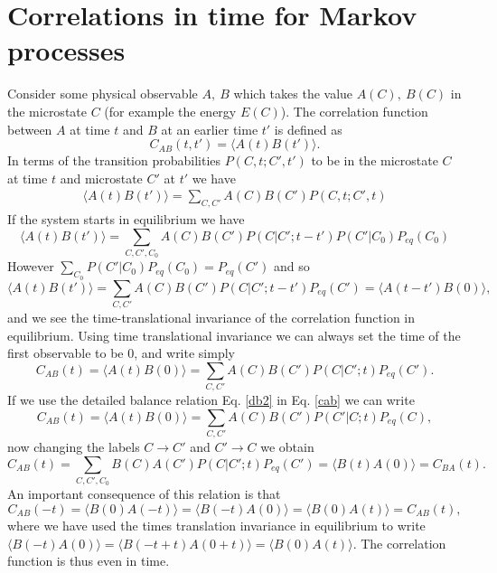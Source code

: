\documentclass[11pt]{report}
\begin{document}
\section{Correlations in time for Markov processes}
Consider some physical observable $A,\ B$ which takes the value $A(C),\ B(C)$ in the microstate 
$C$ (for example the energy $E(C)$). The correlation function between $A$ at time $t$ and
$B$ at an earlier time $t'$ is defined as
\begin{equation}
C_{AB}(t,t') = \langle A(t)B(t')\rangle .
\end{equation} 
In terms of the transition probabilities $P(C,t;C',t')$ to be in the microstate $C$ at time $t$ and microstate $C'$ at $t'$ we have
\begin{eqnarray}
\langle A(t)B(t')\rangle  = \sum_{C,C'} A(C)B(C') P(C,t;C',t)
\end{eqnarray} 
If the system starts in equilibrium we have
\begin{equation}
\langle A(t)B(t')\rangle  = \sum_{C,C',C_0} A(C)B(C') P(C|C';t-t')P(C'|C_0)P_{eq}(C_0)
\end{equation}
However $\sum_{C_0} P(C'|C_0)P_{eq}(C_0) = P_{eq}(C')$ and so
\begin{equation}
\langle A(t)B(t')\rangle= \sum_{C,C'} A(C)B(C') P(C|C';t-t')P_{eq}(C') = \langle A(t-t')B(0)\rangle,
\end{equation}
and we see the time-translational invariance of the correlation function in equilibrium. 
Using time translational invariance we can always set the time of the first observable 
to be $0$, and write simply
\begin{equation}
C_{AB}(t) = \langle A(t)B(0)\rangle = \sum_{C,C'} A(C)B(C') P(C|C';t)P_{eq}(C').\label{cab}
\end{equation}
If we use the detailed balance relation Eq. \eqref{db2} in Eq. \eqref{cab} we can write
\begin{equation}
C_{AB}(t) = \langle A(t)B(0)\rangle = \sum_{C,C'} A(C)B(C') P(C'|C;t)P_{eq}(C),
\end{equation}
now changing the labels $C\to C'$ and $C'\to C$ we obtain
\begin{equation}
C_{AB}(t) = \sum_{C,C',C_0} B(C) A(C')P(C|C';t)P_{eq}(C') = \langle B(t)A(0)\rangle =C_{BA}(t).
\end{equation}
An important consequence of this relation is that
\begin{equation}
C_{AB}(-t)= \langle B(0)A(-t)\rangle = \langle B(-t)A(0)\rangle = \langle B(0)A(t)\rangle = C_{AB}(t),
\end{equation}
where we have used the times translation invariance in equilibrium to write $\langle B(-t)A(0)\rangle = \langle B(-t+t)A(0+t )\rangle = \langle B(0)A(t)\rangle$. The correlation function is thus even in time.
\end{document}
